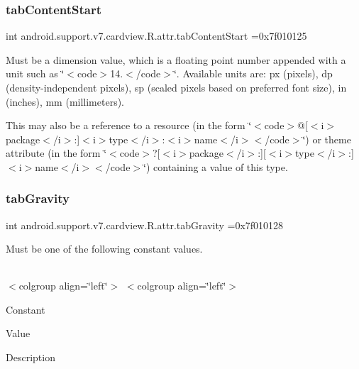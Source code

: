 \subsubsection{\texorpdfstring{tab\+Content\+Start}{tabContentStart}}
{\footnotesize\ttfamily int android.\+support.\+v7.\+cardview.\+R.\+attr.\+tab\+Content\+Start =0x7f010125\hspace{0.3cm}{\ttfamily [static]}}

Must be a dimension value, which is a floating point number appended with a unit such as \char`\"{}$<$code$>$14.\+5sp$<$/code$>$\char`\"{}. Available units are\+: px (pixels), dp (density-\/independent pixels), sp (scaled pixels based on preferred font size), in (inches), mm (millimeters). 

This may also be a reference to a resource (in the form \char`\"{}$<$code$>$@\mbox{[}$<$i$>$package$<$/i$>$\+:\mbox{]}$<$i$>$type$<$/i$>$\+:$<$i$>$name$<$/i$>$$<$/code$>$\char`\"{}) or theme attribute (in the form \char`\"{}$<$code$>$?\mbox{[}$<$i$>$package$<$/i$>$\+:\mbox{]}\mbox{[}$<$i$>$type$<$/i$>$\+:\mbox{]}$<$i$>$name$<$/i$>$$<$/code$>$\char`\"{}) containing a value of this type. \mbox{\label{classandroid_1_1support_1_1v7_1_1cardview_1_1R_1_1attr_a33950a613ff954c84c39d6d194da00b2}} 
\subsubsection{\texorpdfstring{tab\+Gravity}{tabGravity}}
{\footnotesize\ttfamily int android.\+support.\+v7.\+cardview.\+R.\+attr.\+tab\+Gravity =0x7f010128\hspace{0.3cm}{\ttfamily [static]}}

Must be one of the following constant values.

\tabulinesep=1mm
\begin{longtabu} spread 0pt [c]{*{0}{|X[-1]}|}
\hline
\end{longtabu}
$<$colgroup align=\char`\"{}left\char`\"{}$>$ $<$colgroup align=\char`\"{}left\char`\"{}$>$ 

Constant

Value

Description 

